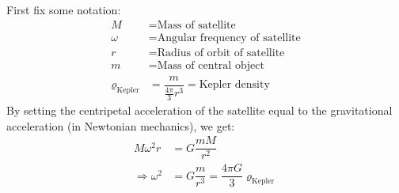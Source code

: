 \subsubsection{ }
First fix some notation:
\begin{align*} 
	M&=\text{Mass of satellite}\\
	\omega&=\text{Angular frequency of satellite}\\
	r&=\text{Radius of orbit of satellite}\\
	m&=\text{Mass of central object}\\
	\varrho_{\text{Kepler}}&=\dfrac{m}{\frac{4\pi}{3}r^3}=\text{Kepler density}
\end{align*}
By setting the centripetal acceleration of the satellite equal to the gravitational acceleration (in Newtonian mechanics), we get:
\begin{align*} 
	M\omega^2 r&= G\dfrac{m M}{r^2}\\
	\Rightarrow \omega^2&=G\dfrac{m}{r^3}=\dfrac{4\pi G}{3}\varrho_{\text{Kepler}}
\end{align*}

